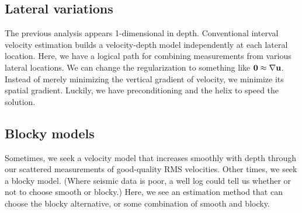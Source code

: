 

\begin{comment}
\moddex{vrms2int}{Converting RMS to interval velocity}
\end{comment}

\subsection{Lateral variations}
The previous analysis appears 1-dimensional in depth.
Conventional interval velocity estimation builds a velocity-depth model
independently at each lateral location.
Here, we have a logical path for combining measurements
from various lateral locations.
We can change the regularization
to something like $\bold 0\approx \nabla\bold u$.
Instead of merely minimizing the vertical gradient of velocity,
we minimize its spatial gradient.
Luckily, we have preconditioning and the helix to speed the solution.
\par

\subsection{Blocky models}

Sometimes, we seek a velocity model that increases smoothly
with depth through our scattered
measurements of good-quality RMS velocities.
Other times, we seek a blocky model.
(Where seismic data is poor,
a well log could tell us whether or not to choose smooth or blocky.)
Here, we see an estimation method that can choose the blocky alternative,
or some combination of smooth and blocky.


